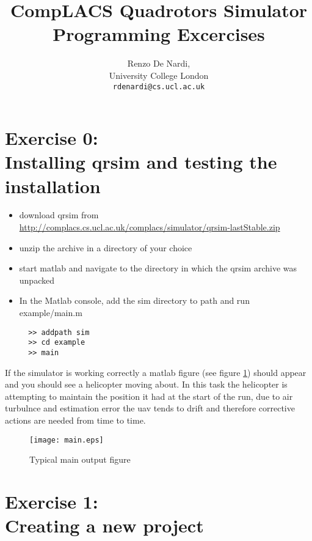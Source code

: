 \documentclass[a4paper,11pt]{article}
\title{{CompLACS} Quadrotors Simulator Programming Excercises}
\author{Renzo De Nardi,\\University College London\\\texttt{rdenardi@cs.ucl.ac.uk}}
\newcommand{\webrepo}{\url{http://complacs.cs.ucl.ac.uk/complacs/simulator/qrsim-lastStable.zip}\xspace}
\begin{document}
\section*{Exercise 0:\\Installing qrsim and testing the installation}

\begin{itemize}
 \item download qrsim from \\\webrepo
 \item unzip the archive in a directory of your choice
 \item start matlab and navigate to the directory in which the qrsim archive was unpacked
 \item In the Matlab console, add the sim directory to path and run example/main.m
  \begin{verbatim}
  >> addpath sim
  >> cd example
  >> main
  \end{verbatim}
\end{itemize}
If the simulator is working correctly a matlab figure (see figure \ref{fig:main}) should appear and you should see a helicopter moving about. In this task the helicopter is attempting to maintain the position it had at the start of the run, due to air turbulnce and estimation error the uav tends to drift and therefore corrective actions are needed from time to time. 
\begin{figure}[h]
\begin{center}
\label{fig:main}
\texttt{[image: main.eps]}
 \caption{Typical main output figure}
\end{center}
\end{figure}

\section*{Exercise 1:\\Creating a new project}
\end{document}
